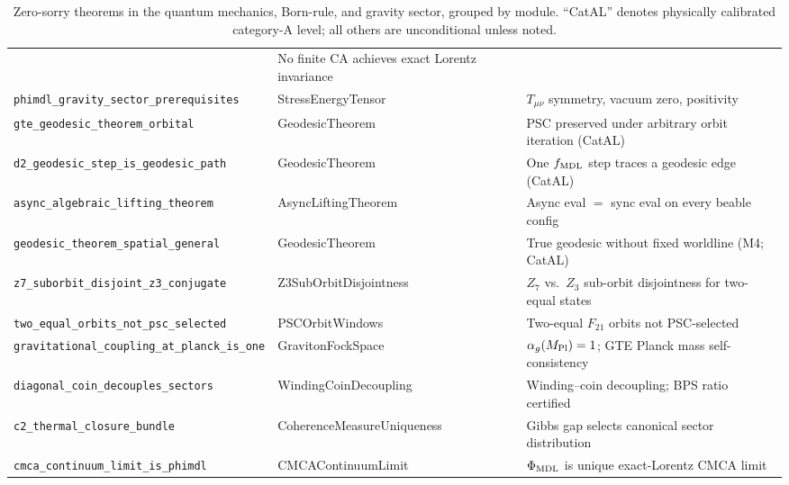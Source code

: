 \documentclass[11pt,a4paper]{article}
\theoremstyle{definition}
\begin{document}
\begin{table}[h]
\begin{tabular}{@{}p{5.2cm}p{3.5cm}p{6.6cm}@{}}
  & No finite CA achieves exact Lorentz invariance \\[1pt]
\texttt{phimdl\_\allowbreak gravity\_\allowbreak sector\_\allowbreak prerequisites}
  & StressEnergy\allowbreak Tensor
  & $T_{\mu\nu}$ symmetry, vacuum zero, positivity \\[1pt]
\texttt{gte\_\allowbreak geodesic\_\allowbreak theorem\_\allowbreak orbital}
  & GeodesicTheorem
  & PSC preserved under arbitrary orbit iteration (CatAL) \\[1pt]
\texttt{d2\_\allowbreak geodesic\_\allowbreak step\_\allowbreak is\_\allowbreak geodesic\_\allowbreak path}
  & GeodesicTheorem
  & One $f_{\rm MDL}$ step traces a geodesic edge (CatAL) \\[1pt]
\texttt{async\_\allowbreak algebraic\_\allowbreak lifting\_\allowbreak theorem}
  & AsyncLifting\allowbreak Theorem
  & Async eval $=$ sync eval on every beable config \\[1pt]
\texttt{geodesic\_\allowbreak theorem\_\allowbreak spatial\_\allowbreak general}
  & GeodesicTheorem
  & True geodesic without fixed worldline (M4; CatAL) \\[1pt]
\texttt{z7\_\allowbreak suborbit\_\allowbreak disjoint\_\allowbreak z3\_\allowbreak conjugate}
  & Z3SubOrbit\allowbreak Disjointness
  & $Z_7$ vs.\ $Z_3$ sub-orbit disjointness for two-equal states \\[1pt]
\texttt{two\_\allowbreak equal\_\allowbreak orbits\_\allowbreak not\_\allowbreak psc\_\allowbreak selected}
  & PSCOrbit\allowbreak Windows
  & Two-equal $F_{21}$ orbits not PSC-selected \\[1pt]
\texttt{gravitational\_\allowbreak coupling\_\allowbreak at\_\allowbreak planck\_\allowbreak is\_\allowbreak one}
  & GravitonFock\allowbreak Space
  & $\alpha_g(M_{\rm Pl})=1$; GTE Planck mass self-consistency \\[1pt]
\texttt{diagonal\_\allowbreak coin\_\allowbreak decouples\_\allowbreak sectors}
  & WindingCoin\allowbreak Decoupling
  & Winding--coin decoupling; BPS ratio certified \\[1pt]
\texttt{c2\_\allowbreak thermal\_\allowbreak closure\_\allowbreak bundle}
  & CoherenceMeasure\allowbreak Uniqueness
  & Gibbs gap selects canonical sector distribution \\[1pt]
\texttt{cmca\_\allowbreak continuum\_\allowbreak limit\_\allowbreak is\_\allowbreak phimdl}
  & CMCAContinuum\allowbreak Limit
  & $\Phi_{\rm MDL}$ is unique exact-Lorentz CMCA limit \\
\bottomrule
\end{tabular}
\caption{Zero-sorry theorems in the quantum mechanics, Born-rule, and gravity sector,
  grouped by module. ``CatAL'' denotes physically calibrated category-A level;
  all others are unconditional unless noted.}
\label{tab:new-theorem-inventory}
\end{table}
\end{document}
